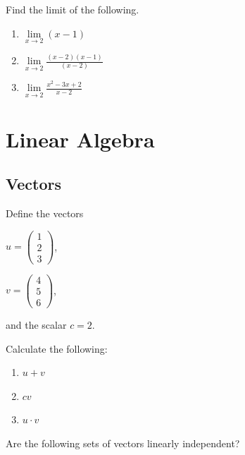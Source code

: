 \documentclass[
  letterpaper,
]{book}
\providecommand{\tightlist}{%
  \setlength{\itemsep}{0pt}\setlength{\parskip}{0pt}}\usepackage{longtable,booktabs,array}
\theoremstyle{definition}
\theoremstyle{definition}
\theoremstyle{plain}
\theoremstyle{definition}
\theoremstyle{plain}
\theoremstyle{plain}
\theoremstyle{remark}
\begin{document}
Find the limit of the following.

\begin{enumerate}
\def\labelenumi{\arabic{enumi}.}
\tightlist
\item
  \(\lim\limits_{x \to 2} (x - 1)\)
\item
  \(\lim\limits_{x \to 2} \frac{(x - 2) (x - 1)}{(x - 2)}\)
\item
  \(\lim\limits_{x \to 2}\frac{x^2 - 3x + 2}{x- 2}\)
\end{enumerate}

\hypertarget{linear-algebra}{%
\section*{Linear Algebra}\label{linear-algebra}}

\hypertarget{vectors}{%
\subsection*{Vectors}\label{vectors}}

Define the vectors

\(u = \begin{pmatrix} 1 \\2 \\3 \end{pmatrix}\),

\(v = \begin{pmatrix} 4\\5\\6 \end{pmatrix}\),

and the scalar \(c = 2\).

Calculate the following:

\begin{enumerate}
\def\labelenumi{\arabic{enumi}.}
\tightlist
\item
  \(u + v\)
\item
  \(cv\)
\item
  \(u \cdot v\)
\end{enumerate}

Are the following sets of vectors linearly independent?
\end{document}
